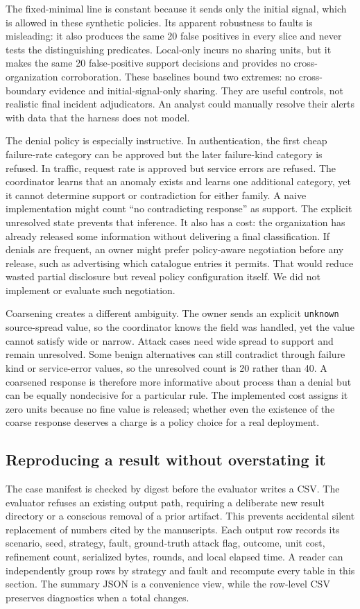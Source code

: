 \documentclass[conference,letterpaper]{IEEEtran}
\begin{document}
The fixed-minimal line is constant because it sends only the initial signal, which is allowed in these synthetic policies. Its apparent robustness to faults is misleading: it also produces the same 20 false positives in every slice and never tests the distinguishing predicates. Local-only incurs no sharing units, but it makes the same 20 false-positive support decisions and provides no cross-organization corroboration. These baselines bound two extremes: no cross-boundary evidence and initial-signal-only sharing. They are useful controls, not realistic final incident adjudicators. An analyst could manually resolve their alerts with data that the harness does not model.

The denial policy is especially instructive. In authentication, the first cheap failure-rate category can be approved but the later failure-kind category is refused. In traffic, request rate is approved but service errors are refused. The coordinator learns that an anomaly exists and learns one additional category, yet it cannot determine support or contradiction for either family. A naive implementation might count ``no contradicting response'' as support. The explicit unresolved state prevents that inference. It also has a cost: the organization has already released some information without delivering a final classification. If denials are frequent, an owner might prefer policy-aware negotiation before any release, such as advertising which catalogue entries it permits. That would reduce wasted partial disclosure but reveal policy configuration itself. We did not implement or evaluate such negotiation.

Coarsening creates a different ambiguity. The owner sends an explicit \texttt{unknown} source-spread value, so the coordinator knows the field was handled, yet the value cannot satisfy wide or narrow. Attack cases need wide spread to support and remain unresolved. Some benign alternatives can still contradict through failure kind or service-error values, so the unresolved count is 20 rather than 40. A coarsened response is therefore more informative about process than a denial but can be equally nondecisive for a particular rule. The implemented cost assigns it zero units because no fine value is released; whether even the existence of the coarse response deserves a charge is a policy choice for a real deployment.

\subsection{Reproducing a result without overstating it}
The case manifest is checked by digest before the evaluator writes a CSV. The evaluator refuses an existing output path, requiring a deliberate new result directory or a conscious removal of a prior artifact. This prevents accidental silent replacement of numbers cited by the manuscripts. Each output row records its scenario, seed, strategy, fault, ground-truth attack flag, outcome, unit cost, refinement count, serialized bytes, rounds, and local elapsed time. A reader can independently group rows by strategy and fault and recompute every table in this section. The summary JSON is a convenience view, while the row-level CSV preserves diagnostics when a total changes.
\end{document}

